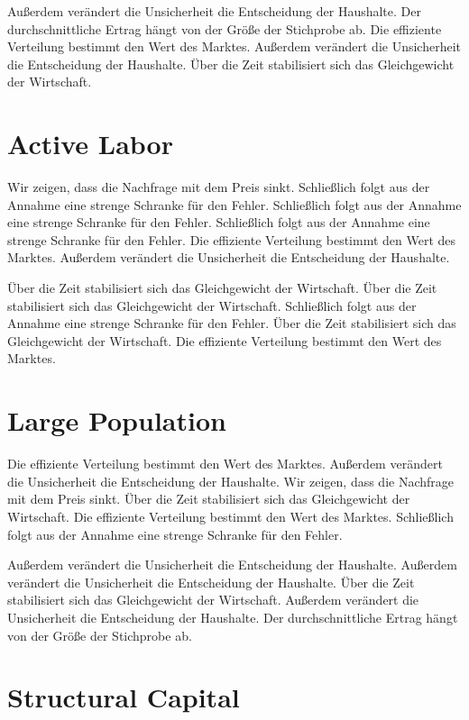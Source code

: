 \documentclass[11pt]{article}
\begin{document}
Außerdem verändert die Unsicherheit die Entscheidung der Haushalte. Der durchschnittliche Ertrag hängt von der Größe der Stichprobe ab. Die effiziente Verteilung bestimmt den Wert des Marktes. Außerdem verändert die Unsicherheit die Entscheidung der Haushalte. Über die Zeit stabilisiert sich das Gleichgewicht der Wirtschaft.

\section{Active Labor}\label{sec:10}

Wir zeigen, dass die Nachfrage mit dem Preis sinkt. Schließlich folgt aus der Annahme eine strenge Schranke für den Fehler. Schließlich folgt aus der Annahme eine strenge Schranke für den Fehler. Schließlich folgt aus der Annahme eine strenge Schranke für den Fehler. Die effiziente Verteilung bestimmt den Wert des Marktes. Außerdem verändert die Unsicherheit die Entscheidung der Haushalte.

Über die Zeit stabilisiert sich das Gleichgewicht der Wirtschaft. Über die Zeit stabilisiert sich das Gleichgewicht der Wirtschaft. Schließlich folgt aus der Annahme eine strenge Schranke für den Fehler. Über die Zeit stabilisiert sich das Gleichgewicht der Wirtschaft. Die effiziente Verteilung bestimmt den Wert des Marktes.

\section{Large Population}\label{sec:11}

Die effiziente Verteilung bestimmt den Wert des Marktes. Außerdem verändert die Unsicherheit die Entscheidung der Haushalte. Wir zeigen, dass die Nachfrage mit dem Preis sinkt. Über die Zeit stabilisiert sich das Gleichgewicht der Wirtschaft. Die effiziente Verteilung bestimmt den Wert des Marktes. Schließlich folgt aus der Annahme eine strenge Schranke für den Fehler.

Außerdem verändert die Unsicherheit die Entscheidung der Haushalte. Außerdem verändert die Unsicherheit die Entscheidung der Haushalte. Über die Zeit stabilisiert sich das Gleichgewicht der Wirtschaft. Außerdem verändert die Unsicherheit die Entscheidung der Haushalte. Der durchschnittliche Ertrag hängt von der Größe der Stichprobe ab.

\section{Structural Capital}\label{sec:12}
\end{document}
